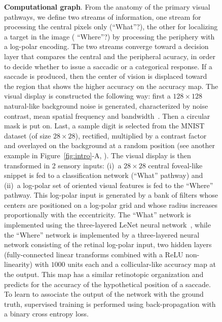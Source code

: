 \begin{figure}[t!]%
	\caption{%
		{\bf Computational graph}. From the anatomy of the primary visual pathways, we define two streams of information, one stream for processing the central pixels only (``What''?), the other for localizing a target in the image ( ``Where''?) by processing the periphery with a log-polar encoding. The two streams converge toward a decision layer that compares the central and the peripheral acuracy, in order to decide whether to issue a saccadic or a categorical response. If a saccade is produced, then the center of vision is displaced toward the region that shows the higher accuracy on the accuracy map.
		\A The visual display is constructed the following way: first a  $128\times 128$  natural-like background noise is generated, characterized by noise contrast, mean spatial frequency and bandwidth~\cite{Sanz12}. Then a circular mask is put on. Last, a sample digit is selected from the MNIST dataset (of size $28\times 28$), rectified, multiplied by a contrast factor and overlayed on the background at a random position (see another example in Figure~\ref{fig:intro}-A, \DIS ). %
		\B The visual display is then transformed in 2 sensory inputs: (i)~a $28\times 28$ central foveal-like snippet is fed to a classification network (``What'' pathway) and (ii)~a log-polar set of oriented visual features is fed to the ``Where'' pathway. This log-polar input is generated by a bank of filters whose centers are positioned on a log-polar grid and whose radius increases proportionally with the eccentricity. %
		\C The ``What'' network is implemented using the three-layered LeNet neural network~\cite{Lecun1998}, while the ``Where'' network is implemented by a three-layered neural network consisting of the retinal log-polar input, two hidden layers (fully-connected linear transforms combined with a ReLU non-linearity) with $1000$ units each and a collicular-like accuracy map at the output.  This map has a similar retinotopic organization and predicts for the accuracy of the hypothetical position of a saccade. To learn to associate the output of the network with the ground truth, supervised training is performed using back-propagation with a binary cross entropy loss.
}
\end{figure}
